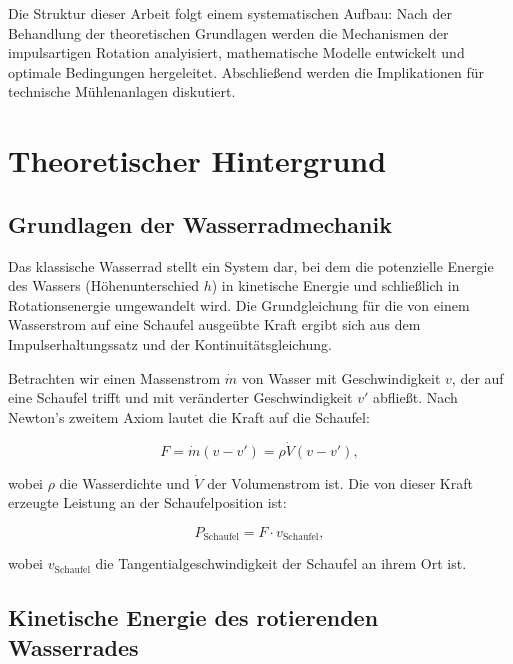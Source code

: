\documentclass[a4paper,12pt]{article}
\theoremstyle{definition}
\begin{document}
Die Struktur dieser Arbeit folgt einem systematischen Aufbau: Nach der Behandlung der theoretischen Grundlagen werden die Mechanismen der impulsartigen Rotation analyisiert, mathematische Modelle entwickelt und optimale Bedingungen hergeleitet. Abschließend werden die Implikationen für technische Mühlenanlagen diskutiert.

\section{Theoretischer Hintergrund}

\subsection{Grundlagen der Wasserradmechanik}

Das klassische Wasserrad stellt ein System dar, bei dem die potenzielle Energie des Wassers (Höhenunterschied $h$) in kinetische Energie und schließlich in Rotationsenergie umgewandelt wird. Die Grundgleichung für die von einem Wasserstrom auf eine Schaufel ausgeübte Kraft ergibt sich aus dem Impulserhaltungssatz und der Kontinuitätsgleichung.

Betrachten wir einen Massenstrom $\dot{m}$ von Wasser mit Geschwindigkeit $v$, der auf eine Schaufel trifft und mit veränderter Geschwindigkeit $v'$ abfließt. Nach Newton's zweitem Axiom lautet die Kraft auf die Schaufel:

\begin{equation}
  F = \dot{m}(v - v') = \rho \dot{V} (v - v'),
  \label{eq:kraft_schaufel}
\end{equation}

\noindent
wobei $\rho$ die Wasserdichte und $\dot{V}$ der Volumenstrom ist. Die von dieser Kraft erzeugte Leistung an der Schaufelposition ist:

\begin{equation}
  P_\text{Schaufel} = F \cdot v_\text{Schaufel},
  \label{eq:leistung_schaufel}
\end{equation}

\noindent
wobei $v_\text{Schaufel}$ die Tangentialgeschwindigkeit der Schaufel an ihrem Ort ist.

\subsection{Kinetische Energie des rotierenden Wasserrades}
\end{document}
